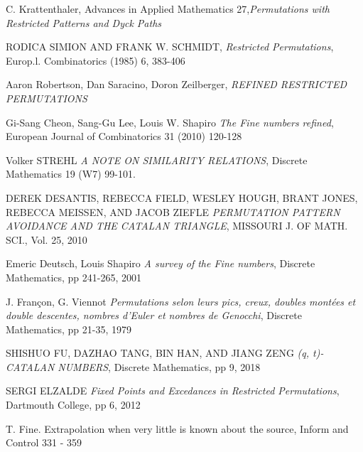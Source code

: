\documentclass[12pt,a4paper]{extreport}
\begin{document}
\tableofcontents
{}

\newpage





\begin{thebibliography}{100} %
	 C. Krattenthaler, Advances in Applied Mathematics 27,\emph{Permutations with
		Restricted Patterns and Dyck Paths}

	 RODICA SIMION AND FRANK W. SCHMIDT, \emph{ Restricted Permutations}, Europ.l.
	Combinatorics (1985) 6, 383-406

	Aaron Robertson, Dan Saracino, Doron Zeilberger, \emph{REFINED RESTRICTED PERMUTATIONS}

	 Gi-Sang Cheon, Sang-Gu Lee, Louis W. Shapiro \emph{The Fine numbers refined}, European
	Journal of Combinatorics 31 (2010) 120-128

	 Volker STREHL \emph{A NOTE ON SIMILARITY RELATIONS},
	Discrete Mathematics 19 (W7) 99-101.

	 DEREK DESANTIS, REBECCA FIELD, WESLEY HOUGH, BRANT JONES, REBECCA MEISSEN, AND JACOB ZIEFLE \emph{PERMUTATION PATTERN AVOIDANCE AND THE CATALAN TRIANGLE},
	MISSOURI J. OF MATH. SCI., Vol. 25, 2010

	 Emeric Deutsch, Louis Shapiro \emph{A survey of the Fine numbers},
	Discrete Mathematics, pp 241-265, 2001

	 J. Françon, G. Viennot \emph{Permutations selon leurs pics, creux, doubles montées et double descentes, nombres d’Euler et nombres de Genocchi},
	Discrete Mathematics, pp 21-35, 1979

	 SHISHUO FU, DAZHAO TANG, BIN HAN, AND JIANG ZENG \emph{(q, t)-CATALAN NUMBERS},
	Discrete Mathematics, pp 9, 2018

	 SERGI ELZALDE \emph{Fixed Points and Excedances in Restricted Permutations},
	Dartmouth College, pp 6, 2012

	 T. Fine. Extrapolation when very little is known about the source, Inform and Control 331 - 359


\end{thebibliography}
\end{document}
